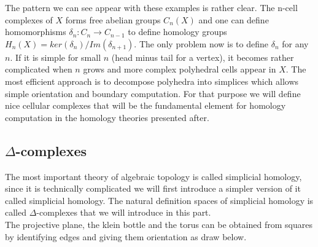 \documentclass[12pt, a4paper]{article}
\begin{document}
The pattern we can see appear with these examples is rather clear. The n-cell complexes of $X$ forms free abelian groups $C_n(X)$ and one can define homomorphisms $\delta_n: C_n \to C_{n-1}$ to define homology groups $H_n(X) = ker(\delta_n)/Im(\delta_{n+1})$. The only problem now is to define $\delta_n$ for any $n$. If it is simple for small $n$ (head minus tail for a vertex), it becomes rather complicated when $n$ grows and more complex polyhedral cells appear in $X$. The most efficient approach is to decompose polyhedra into simplices which allows simple orientation and boundary computation. For that purpose we will define nice cellular complexes that will be the fundamental element for homology computation in the homology theories presented after. 

\subsection{$\Delta$-complexes}
\label{sec:delta_complexes}

The most important theory of algebraic topology is called simplicial homology, since it is technically complicated we will first introduce a simpler version of it called simplicial homology. The natural definition spaces of simplicial homology is called $\Delta$-complexes that we will introduce in this part.\\

The projective plane, the klein bottle and the torus can be obtained from squares by identifying edges and giving them orientation as draw below.
\end{document}
